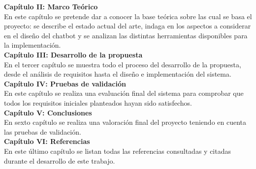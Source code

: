 \noindent \textbf{Capítulo II: Marco Teórico}\\
En este capítulo se pretende dar a conocer la base teórica sobre las cual se basa el proyecto: se describe el estado actual del arte, indaga en los aspectos a considerar en el diseño del chatbot y se analizan las distintas herramientas disponibles para la implementación.\\

\noindent \textbf{Capítulo III: Desarrollo de la propuesta}\\
En el tercer capítulo se muestra todo el proceso del desarrollo de la propuesta, desde el análisis de requisitos hasta el diseño e implementación del sistema. \\

\noindent \textbf{Capítulo IV: Pruebas de validación}\\
En este capítulo se realiza una evaluación final del sistema para comprobar que todos los requisitos iniciales planteados hayan sido satisfechos.\\

\noindent \textbf{Capítulo V: Conclusiones}\\
En sexto capítulo se realiza una valoración final del proyecto teniendo en cuenta las pruebas de validación.\\

\noindent \textbf{Capítulo VI: Referencias}\\
En este último capítulo se listan todas las referencias consultadas y citadas durante el desarrollo de este trabajo.\\